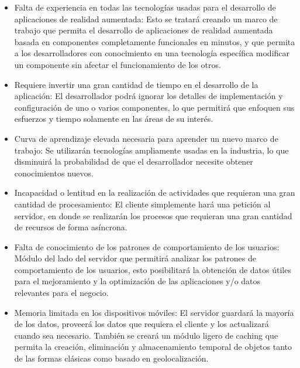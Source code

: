 \documentclass[12pt,a4paper,spanish,openany]{book}
\begin{document}
\begin{itemize}
  \item Falta de experiencia en todas las tecnologías usadas para el desarrollo
  de aplicaciones de realidad aumentada: Esto se tratará creando un marco de
  trabajo que permita el desarrollo de aplicaciones de realidad aumentada basada
  en componentes completamente funcionales en minutos, y que permita a los
  desarrolladores con conocimiento en una tecnología específica modificar un
  componente sin afectar el funcionamiento de los otros.
  
  \item Requiere invertir una gran cantidad de tiempo en el desarrollo
  de la aplicación: El desarrollador podrá ignorar los detalles de implementación y
  configuración de uno o varios componentes, lo que permitirá que enfoquen
  sus esfuerzos y tiempo solamente en las áreas de su interés.
  
  \item Curva de aprendizaje elevada necesaria para aprender un nuevo marco de
  trabajo: Se utilizarán tecnologías ampliamente usadas en la industria, lo que
  disminuirá la probabilidad de que el desarrollador necesite obtener
  conocimientos nuevos.
  
  \item Incapacidad o lentitud en la realización de actividades que requieran
  una gran cantidad de procesamiento: El cliente simplemente hará una petición
  al servidor, en donde se realizarán los procesos que requieran una gran
  cantidad de recursos de forma asíncrona.
  
  \item Falta de conocimiento de los patrones de comportamiento de los usuarios:
  Módulo del lado del servidor que permitirá analizar los patrones de
  comportamiento de los usuarios, esto posibilitará la obtención de datos útiles
  para el mejoramiento y la optimización de las aplicaciones y/o datos relevantes
  para el negocio.
  
  \item Memoria limitada en los dispositivos móviles: El servidor guardará la
  mayoría de los datos, proveerá los datos que requiera el cliente y los
  actualizará cuando sea necesario. También se creará un módulo ligero de
  caching que permita la creación, eliminación y almacenamiento temporal de
  objetos tanto de las formas clásicas como basado en geolocalización.
  
  
\end{itemize}
\end{document}
